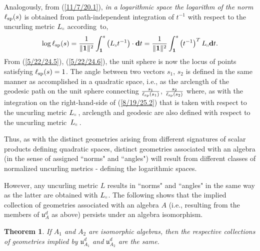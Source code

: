 \documentclass{amsart}
\newtheorem{theorem}{Theorem}
\theoremstyle{definition}
\numberwithin{theorem}{section}
\numberwithin{equation}{section}
\begin{document}
Analogously, from (\ref{11/7/20.1}), {\it in a logarithmic space the logarithm of the norm} $\ell_{\rm sp}(s)$ is obtained from path-independent integration of $t^{-1}$ with respect to the uncurling metric $L_{\shortparallel}$ \mbox{according to},
\begin{equation}\label{8/19/25.2} \log\ell_{\rm sp}(s) =  \frac{1}{\|{\bf 1}\|^2} \int_{\bf 1}^s \left(L_{\shortparallel}t^{-1}\right) \cdot \mathbf{d}t =
\frac{1}{\|{\bf 1}\|^2} \int_{\bf 1}^s \left( t^{-1}\right)^T L_{\shortparallel} \mathbf{d}t .\end{equation} 
 From
(\ref{5/22/24.5}), (\ref{5/22/24.6}), the unit sphere is now the locus of points satisfying $\ell_{\rm sp}(s) = 1$.    The angle between two vectors $s_1$, $s_2$ is defined in the same manner as accomplished in a quadratic space, i.e., as the arclength of the geodesic path on the unit sphere connecting $\frac{s_1}{\ell_{\rm sp}(s_1)}$, $\frac{s_2}{\ell_{\rm sp}(s_2)}$ where, as with the integration on the right-hand-side of (\ref{8/19/25.2}) that is taken with respect to the uncurling metric $L_\shortparallel$\,, arclength and geodesic are also defined with respect to the uncurling \mbox{metric $L_{\shortparallel}$}\,.

Thus, as with the distinct geometries arising from different signatures of scalar products defining quadratic spaces, distinct geometries associated with an algebra (in the sense of assigned ``norms" and ``angles") will result from different classes of normalized uncurling metrics - defining the logarithmic spaces.

However, any uncurling metric $L$ results in ``norms" and ``angles" in the same way as the latter are obtained with $L_\shortparallel$.
The following shows that the implied collection of geometries associated with an algebra $A$ (i.e., resulting from the members of $\mathfrak{u}_A^d$ as above) persists under an algebra isomorphism.  

  \begin{theorem}\label{6/6/23.2} 
If $A_1$ and $A_2$ are isomorphic algebras, then the respective collections of geometries implied by $\mathfrak{u}_{A_1}^d$ and  $\mathfrak{u}_{A_2}^d$ are the same.
 \end{theorem}
\end{document}
